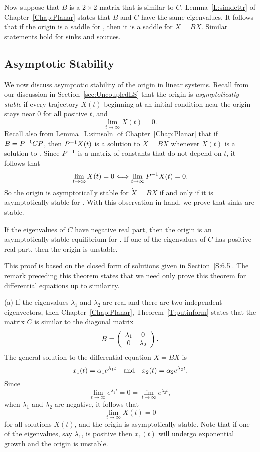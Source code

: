 \documentclass{ximera}
\begin{document}
Now suppose that $B$ is a $2\times 2$ matrix that is similar to $C$.
Lemma~\ref{L:simdettr} of Chapter~\ref{Chap:Planar} states that $B$ and
$C$ have the same eigenvalues.  It follows that if the origin is a saddle
for , then it is a saddle for $\dot{X}=BX$.  Similar statements
hold for sinks and sources.

\subsection*{Asymptotic Stability}

We now discuss asymptotic stability of the origin in linear systems.
Recall from our discussion in Section~\ref{sec:UncoupledLS} 
that the origin is {\em asymptotically stable\/} 
if every trajectory $X(t)$ beginning at an initial condition near the
origin stays near $0$ for all positive $t$, and
\[
\lim_{t\to\infty}X(t) = 0.
\]
Recall also from Lemma~\ref{L:simsoln} of Chapter~\ref{Chap:Planar} that
if $B=P^{-1} CP$, then $P^{-1} X(t)$ is a solution to $\dot{X}=BX$ whenever
$X(t)$ is a solution to .  Since $P^{-1}$ is a matrix of constants
that do not depend on $t$, it follows that
\[
\lim_{t\to\infty}X(t) = 0 \Longleftrightarrow \lim_{t\to\infty}P^{-1} X(t) = 0.
\]
So the origin is asymptotically stable for $\dot{X}=BX$ if and only if it is
asymptotically stable for .  With this observation in hand, we
prove that sinks are stable.

\begin{thm}  \label{C:asympstlin}
If the eigenvalues of $C$ have negative real part, then the origin
is an asymptotically stable equilibrium for .
If one of the
eigenvalues of $C$ has positive real part, then the origin is unstable.
\end{thm}

\proof  This proof is based on the closed form of solutions given in
Section~\ref{S:6.5}.   The remark preceding this theorem states that we
need only prove this theorem for differential equations up to similarity.

\noindent (a) \quad If the eigenvalues $\lambda_1$ and $\lambda_2$ are real
and there are two independent eigenvectors, then Chapter~\ref{Chap:Planar},
Theorem~\ref{T:putinform} states that the matrix $C$ is similar to the
diagonal matrix
\[
B = \left(\begin{array}{cc} \lambda_1 & 0\\ 0 &\lambda_2\end{array}\right).
\]
The general solution to the differential equation $\dot{X}=BX$ is
\[
x_1(t) = \alpha_1e^{\lambda_1 t} \quad\mbox{and}\quad x_2(t) = \alpha_2e^{\lambda_2 t}.
\]
Since
\[
\lim_{t\to\infty}e^{\lambda_1 t} = 0  = \lim_{t\to\infty}e^{\lambda_2 t},
\]
when $\lambda_1$ and $\lambda_2$ are negative, it follows that
\[
\lim_{t\to\infty} X(t) = 0
\]
for all solutions $X(t)$, and the origin is asymptotically stable.  Note that
if one of the eigenvalues, say $\lambda_1$, is positive then $x_1(t)$ will
undergo exponential growth and the origin is unstable.
\end{document}
